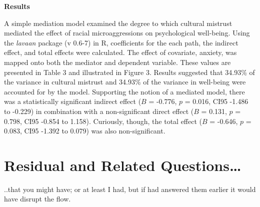\documentclass[
  11pt,
]{book}
\begin{document}
\textbf{Results}

A simple mediation model examined the degree to which cultural mistrust mediated the effect of racial microaggressions on psychological well-being. Using the \emph{lavaan} package (v 0.6-7) in R, coefficients for the each path, the indirect effect, and total effects were calculated. The effect of covariate, anxiety, was mapped onto both the mediator and dependent variable. These values are presented in Table 3 and illustrated in Figure 3. Results suggested that 34.93\% of the variance in cultural mistrust and 34.93\% of the variance in well-being were accounted for by the model. Supporting the notion of a mediated model, there was a statistically significant indirect effect (\(B\) = -0.776, \(p\) = 0.016, CI95 -1.486 to -0.229) in combination with a non-significant direct effect (\(B\) = 0.131, \(p\) = 0.798, CI95 -0.854 to 1.158). Curiously, though, the total effect (\(B\) = -0.646, \(p\) = 0.083, CI95 -1.392 to 0.079) was also non-significant.

\hypertarget{residual-and-related-questions}{%
\section{Residual and Related Questions\ldots{}}\label{residual-and-related-questions}}

..that you might have; or at least I had, but if had answered them earlier it would have disrupt the flow.
\end{document}
